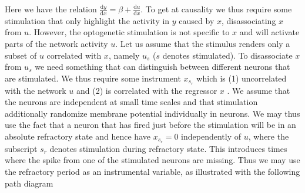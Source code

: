 \documentclass[11pt]{article}
\newcommand{\de}[2]{\frac{\mathrm{d} #1}{\mathrm{d} #2}}
\begin{document}
\begin{center}
\end{center}
Here we have the relation $ \de{y}{x} = \beta + \de{u}{x} $. To get at causality we thus require some stimulation that only highlight the activity in $ y $ caused by $ x $, disassociating $x$ from $u$. However, the optogenetic stimulation is not specific to $x$ and will activate parts of the network activity $ u $. Let us assume that the stimulus renders only a subset of $u$ correlated with $x$, namely $u_s$ ($s$ denotes stimulated). To disassociate $x$ from $u_s$ we need something that can distinguish between different neurons that are stimulated. We thus require some instrument $ x_{s_r} $ which is (1) uncorrelated with the network $ u $ and (2) is correlated with the regressor $ x $ \citep{angrist2008mostly}. We assume that the neurons are independent at small time scales and that stimulation additionally randomize membrane potential individually in neurons. We may thus use the fact that a neuron that has fired just before the stimulation will be in an absolute refractory state and hence have $ x_{s_r}=0 $ independently of $u$, where the subscript $s_r$ denotes stimulation during refractory state. This introduces times where the spike from one of the stimulated neurons are missing. Thus we may use the refractory period as an instrumental variable, as illustrated with the following path diagram
\end{document}
